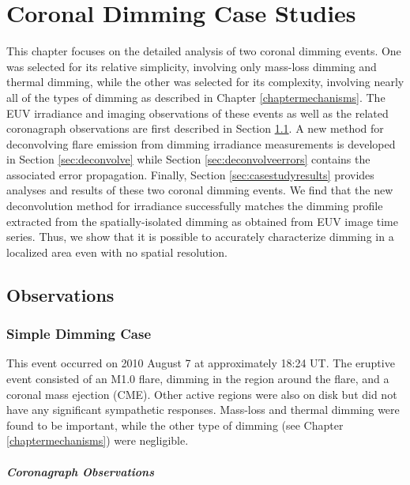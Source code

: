 \chapter{Coronal Dimming Case Studies}
\label{chaptercasestudy}

This chapter focuses on the detailed analysis of two coronal dimming events. One was selected for its relative simplicity, involving only mass-loss dimming and thermal dimming, while the other was selected for its complexity, involving nearly all of the types of dimming as described in Chapter \ref{chaptermechanisms}. The EUV irradiance and imaging observations of these events as well as the related coronagraph observations are first described in Section \ref{sec:observations}. A new method for deconvolving flare emission from dimming irradiance measurements is developed in Section \ref{sec:deconvolve} while Section \ref{sec:deconvolveerrors} contains the associated error propagation. Finally, Section \ref{sec:casestudyresults} provides analyses and results of these two coronal dimming events. We find that the new deconvolution method for irradiance successfully matches the dimming profile extracted from the spatially-isolated dimming as obtained from EUV image time series. Thus, we show that it is possible to accurately characterize dimming in a localized area even with no spatial resolution. 

\section{Observations}
\label{sec:observations}

\subsection{Simple Dimming Case}
\label{sec:observationssimple}
This event occurred on 2010 August 7 at approximately 18:24 UT. The eruptive event consisted of an M1.0 flare, dimming in the region around the flare, and a coronal mass ejection (CME). Other active regions were also on disk but did not have any significant sympathetic responses. Mass-loss and thermal dimming were found to be important, while the other type of dimming (see Chapter \ref{chaptermechanisms}) were negligible. 

\paragraph{Coronagraph Observations}

